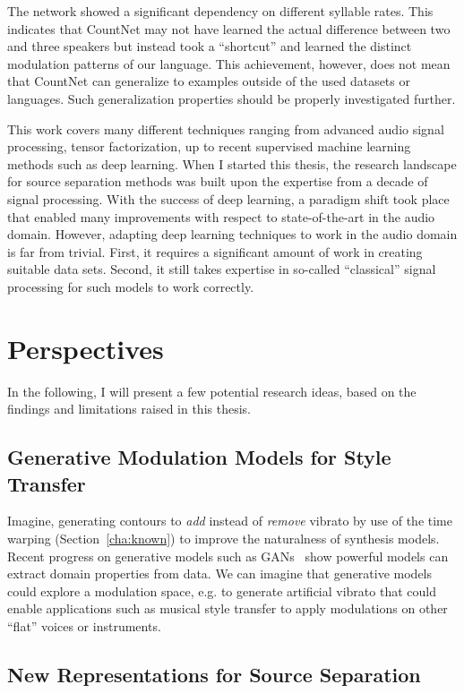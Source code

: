 The network showed a significant dependency on different syllable rates. This indicates that CountNet may not have learned the actual difference between two and three speakers but instead took a ``shortcut'' and learned the distinct modulation patterns of our language.
This achievement, however, does not mean that CountNet can generalize to examples outside of the used datasets or languages. Such generalization properties should be properly investigated further.
\par
This work covers many different techniques ranging from advanced audio signal processing, tensor factorization, up to recent supervised machine learning methods such as deep learning.
When I started this thesis, the research landscape for source separation methods was built upon the expertise from a decade of signal processing.
With the success of deep learning, a paradigm shift took place that enabled many improvements with respect to state-of-the-art in the audio domain. However, adapting deep learning techniques to work in the audio domain is far from trivial. First, it requires a significant amount of work in creating suitable data sets. Second, it still takes expertise in so-called ``classical'' signal processing for such models to work correctly.

\section{Perspectives}

In the following, I will present a few potential research ideas, based on the findings and limitations raised in this thesis.

\subsection*{Generative Modulation Models for Style Transfer}
Imagine, generating contours to \emph{add} instead of \emph{remove} vibrato by use of the time warping (Section~\ref{cha:known}) to improve the naturalness of synthesis models.
Recent progress on generative models such as GANs~\cite{goodfellow14} show powerful models can extract domain properties from data.
We can imagine that generative models could explore a modulation space, e.g. to generate artificial vibrato that could enable applications such as musical style transfer to apply modulations on other ``flat'' voices or instruments.

\subsection*{New Representations for Source Separation}


